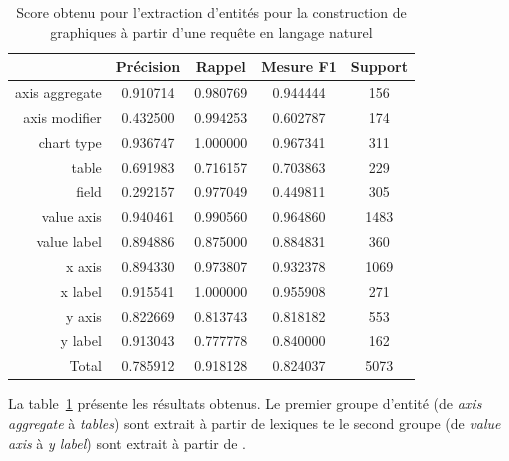 \begin{table}[htb]
    \centering
    \begin{tabular}{r|cccc}
                       & Précision      & Rappel         & Mesure F1      & Support    \\
        \hline
        \hline
        axis aggregate & \num{0,910714} & \num{0,980769} & \num{0,944444} & \num{ 156} \\
        axis modifier  & \num{0,432500} & \num{0,994253} & \num{0,602787} & \num{ 174} \\
        chart type     & \num{0,936747} & \num{1,000000} & \num{0,967341} & \num{ 311} \\
        table          & \num{0,691983} & \num{0,716157} & \num{0,703863} & \num{ 229} \\
        field          & \num{0,292157} & \num{0,977049} & \num{0,449811} & \num{ 305} \\
        \hline
        value axis     & \num{0,940461} & \num{0,990560} & \num{0,964860} & \num{1483} \\
        value label    & \num{0,894886} & \num{0,875000} & \num{0,884831} & \num{ 360} \\
        x axis         & \num{0,894330} & \num{0,973807} & \num{0,932378} & \num{1069} \\
        x label        & \num{0,915541} & \num{1.000000} & \num{0,955908} & \num{ 271} \\
        y axis         & \num{0,822669} & \num{0,813743} & \num{0,818182} & \num{ 553} \\
        y label        & \num{0,913043} & \num{0,777778} & \num{0,840000} & \num{ 162} \\
        \hline
        Total          & \num{0,785912} & \num{0,918128} & \num{0,824037} & \num{5073}
    \end{tabular}
    \caption[Score obtenu pour l'extraction d'entités pour la construction de graphiques]{Score obtenu pour l'extraction d'entités pour la construction de graphiques à partir d'une requête en langage naturel}
    \label{tab:nl-query:result-dashboard}
\end{table}

La table~\ref{tab:nl-query:result-dashboard} présente les résultats obtenus.
Le premier groupe d'entité (de \emph{axis aggregate} à \emph{tables}) sont extrait à partir de lexiques te le second groupe (de \emph{value axis} à \emph{y label}) sont extrait à partir de .

\FloatBarrier
